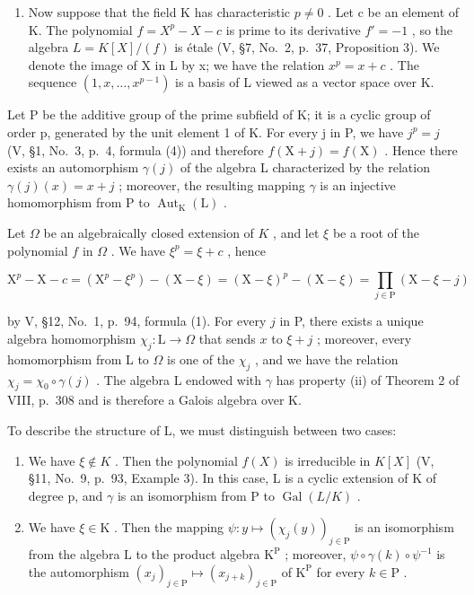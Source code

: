 \begin{enumerate}
\def\labelenumi{\arabic{enumi})}
\setcounter{enumi}{1}
\tightlist
\item
  Now suppose that the field K has characteristic \(p \neq 0\) . Let c be an element of K. The polynomial \(f = X^{p} - X - c\) is prime to its derivative \(f' = -1\) , so the algebra \(L = K[X]/(f)\) is étale (V, §7, No.~2, p.~37, Proposition 3). We denote the image of X in L by x; we have the relation \(x^{p} = x + c\) . The sequence \((1, x, \ldots, x^{p-1})\) is a basis of L viewed as a vector space over K.
\end{enumerate}

Let P be the additive group of the prime subfield of K; it is a cyclic group of order p, generated by the unit element 1 of K. For every j in P, we have \(j^{p} = j\) (V, §1, No.~3, p.~4, formula (4)) and therefore \(f(\mathrm{X} + j) = f(\mathrm{X})\) . Hence there exists an automorphism \(\gamma(j)\) of the algebra L characterized by the relation \(\gamma(j)(x) = x + j\) ; moreover, the resulting mapping \(\gamma\) is an injective homomorphism from P to \(\operatorname{Aut}_{\mathrm{K}}(\mathrm{L})\) .

Let \(\Omega\) be an algebraically closed extension of \(K\) , and let \(\xi\) be a root of the polynomial \(f\) in \(\Omega\) . We have \(\xi^p = \xi + c\) , hence

\[
\mathrm{X} ^ {p} - \mathrm{X} - c = (\mathrm{X} ^ {p} - \xi^ {p}) - (\mathrm{X} - \xi) = (\mathrm{X} - \xi) ^ {p} - (\mathrm{X} - \xi) = \prod_ {j \in \mathrm{P}} (\mathrm{X} - \xi - j)
\]

by V, §12, No.~1, p.~94, formula (1). For every \(j\) in P, there exists a unique algebra homomorphism \(\chi_j: \mathrm{L} \to \Omega\) that sends \(x\) to \(\xi + j\) ; moreover, every homomorphism from L to \(\Omega\) is one of the \(\chi_j\) , and we have the relation \(\chi_{j}=\chi_{0}\circ\gamma(j)\) . The algebra L endowed with \(\gamma\) has property (ii) of Theorem 2 of VIII, p.~308 and is therefore a Galois algebra over K.

To describe the structure of L, we must distinguish between two cases:

\begin{enumerate}
\def\labelenumi{\alph{enumi})}
\item
  We have \(\xi\notin K\) . Then the polynomial \(f(X)\) is irreducible in \(K[X]\) (V, §11, No.~9, p.~93, Example 3). In this case, L is a cyclic extension of K of degree p, and \(\gamma\) is an isomorphism from P to \(\operatorname{Gal}(L/K)\) .
\item
  We have \(\xi \in \mathrm{K}\) . Then the mapping \(\psi : y \mapsto (\chi_j(y))_{j \in \mathrm{P}}\) is an isomorphism from the algebra \(\mathrm{L}\) to the product algebra \(\mathrm{K}^{\mathrm{P}}\) ; moreover, \(\psi \circ \gamma(k) \circ \psi^{-1}\) is the automorphism \((x_j)_{j \in \mathrm{P}} \mapsto (x_{j+k})_{j \in \mathrm{P}}\) of \(\mathrm{K}^{\mathrm{P}}\) for every \(k \in \mathrm{P}\) .
\end{enumerate}

